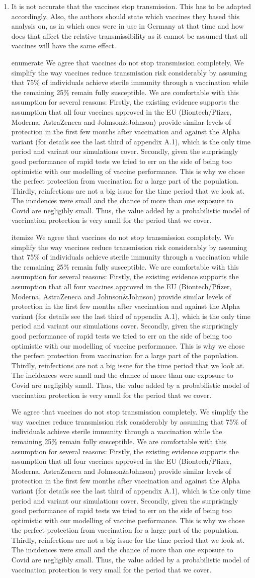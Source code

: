 \documentclass[a4paper,11pt]{article}
\makeatletter
\theoremstyle{plain}
\newlength{\parindentaux}
\newcommand*\@myenumerate{enumerate}
\newcommand*\@myitemize{itemize}
\newcommand{\response}[1]{{%
		\color{black}%
		\par\frenchspacing%
		\ifx\@currenvir\@myenumerate%
		\addtolength{\leftskip}{-\parindentaux}%
		\rm\noindent #1\par%
		\addtolength{\leftskip}{\parindentaux}%
		\else%
		\ifx\@currenvir\@myitemize%
		\addtolength{\leftskip}{-\parindentaux}%
		\rm\noindent #1\par%
		\addtolength{\leftskip}{\parindentaux}%
		\else%
		\rm\noindent #1\par%
		\fi%
		\fi%
}}
\makeatother
\begin{document}
{\begin{enumerate}
          \response{%
              We now cite our main reference for the susceptibilities for each age group also in the main text. We directly take the susceptibilities given by Davies et al. 2020, in their Extended Data Fig. 4.
              We base our assumption on infectiousness being independent of age on Jones et al. 2021. They report only slight differences in viral loads between German adults and children: ``The least infectious youngest children have 78\% (61, 94) of the peak culture probability of adults aged 45 to 55''. Furthermore, they caution that these lower numbers may be due to different sample taking - such as the usage of smaller pediatric swab devices - rather than actual lower viral loads and conclude that the differences, if existent, are likely not clinically relevant.
          }
    \item It is not accurate that the vaccines stop transmission. This has to be adapted accordingly. Also, the authors should state which vaccines they based this analysis on, as in which ones were in use in Germany at that time and how does that affect the relative transmissibility as it cannot be assumed that all vaccines will have the same effect.
          \response{%
          We agree that vaccines do not stop transmission completely. We simplify the way vaccines reduce transmission risk considerably by assuming that 75\% of individuals achieve sterile immunity through a vaccination while the remaining 25\% remain fully susceptible. We are comfortable with this assumption for several reasons: 
          Firstly, the existing evidence supports the assumption that all four vaccines approved in the EU (Biontech/Pfizer, Moderna, AstraZeneca and Johnson&Johnson) provide similar levels of protection in the first few months after vaccination and against the Alpha variant (for details see the last third of appendix A.1), which is the only time period and variant our simulations cover.
          Secondly, given the surprisingly good performance of rapid tests we tried to err on the side of being too optimistic with our modelling of vaccine performance. This is  why we chose the perfect protection from vaccination for a large part of the population. 
          Thirdly, reinfections are not a big issue for the time period that we look at. The incidences were small and the chance of more than one exposure to Covid are negligibly small. Thus, the value added by a probabilistic model of vaccination protection is very small for the period that we cover.
          }
\end{enumerate}
}


% 
% 
\end{document}
